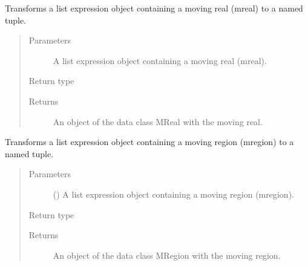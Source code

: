 \documentclass[letterpaper,10pt,english]{sphinxmanual}
\begin{document}

\begin{fulllineitems}
\label{\detokenize{index:secondodb.api.algebras.secondospatiotemporalalgebra.parse_mreal}}
Transforms a list expression object containing a moving real (mreal) to a named tuple.
\begin{quote}\begin{description}
\item[{Parameters}] \leavevmode
{} \textendash{} A list expression object containing a moving real (mreal).

\item[{Return type}] \leavevmode
{\hyperref[\detokenize{index:secondodb.api.algebras.secondospatiotemporalalgebra.MReal}]{}}

\item[{Returns}] \leavevmode
An object of the data class MReal with the moving real.

\end{description}\end{quote}

\end{fulllineitems}


\begin{fulllineitems}
\label{\detokenize{index:secondodb.api.algebras.secondospatiotemporalalgebra.parse_mregion}}
Transforms a list expression object containing a moving region (mregion) to a named tuple.
\begin{quote}\begin{description}
\item[{Parameters}] \leavevmode
{} () \textendash{} A list expression object containing a moving region (mregion).

\item[{Return type}] \leavevmode
{\hyperref[\detokenize{index:secondodb.api.algebras.secondospatiotemporalalgebra.MRegion}]{}}

\item[{Returns}] \leavevmode
An object of the data class MRegion with the moving region.

\end{description}\end{quote}

\end{fulllineitems}
\end{document}
